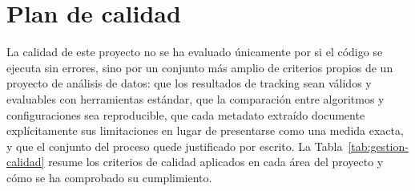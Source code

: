 \section{Plan de calidad}
\label{sec:gestion-calidad}

La calidad de este proyecto no se ha evaluado únicamente por si el código
se ejecuta sin errores, sino por un conjunto más amplio de criterios
propios de un proyecto de análisis de datos: que los resultados de
tracking sean válidos y evaluables con herramientas estándar, que la
comparación entre algoritmos y configuraciones sea reproducible, que cada
metadato extraído documente explícitamente sus limitaciones en lugar de
presentarse como una medida exacta, y que el conjunto del proceso quede
justificado por escrito. La Tabla~\ref{tab:gestion-calidad} resume los
criterios de calidad aplicados en cada área del proyecto y cómo se ha
comprobado su cumplimiento.

